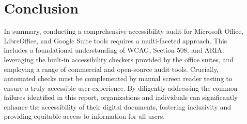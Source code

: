 \section{Conclusion}
\label{sec:office-conclusion}

\begin{raggedright}
In summary, conducting a comprehensive accessibility audit for Microsoft Office, LibreOffice, and Google Suite tools requires a multi-faceted approach. This includes a foundational understanding of WCAG, Section 508, and ARIA, leveraging the built-in accessibility checkers provided by the office suites, and employing a range of commercial and open-source audit tools. Crucially, automated checks must be complemented by manual screen reader testing to ensure a truly accessible user experience. By diligently addressing the common failures identified in this report, organizations and individuals can significantly enhance the accessibility of their digital documents, fostering inclusivity and providing equitable access to information for all users.
\end{raggedright}

